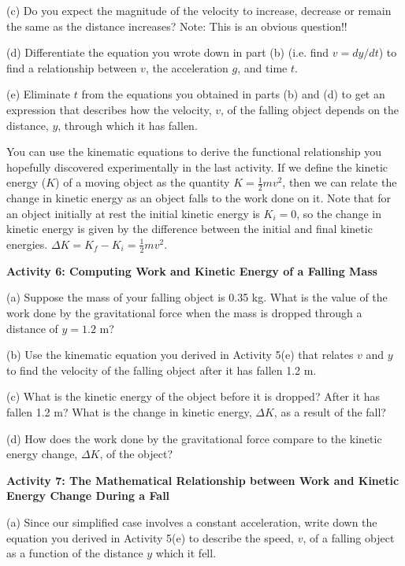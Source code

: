 \pagebreak[2]
(c) Do you expect the magnitude of the velocity to increase, decrease or remain
the same as the distance increases? Note: This is an obvious question!!
\answerspace{10mm}

(d) Differentiate the equation you wrote down in part (b) (i.e. find $v = dy/dt$) to find a relationship between $v$, the acceleration $g$, and time $t$.
\answerspace{20mm}

(e) Eliminate $t$ from the equations you obtained in parts (b) and (d) to get
an expression that describes how the velocity, $v$, 
of the falling object depends
on the distance, $y$, through which it has fallen. 
\answerspace{20mm}

You can use the kinematic equations to derive the functional relationship you
hopefully discovered experimentally in the last activity. If we define the kinetic
energy ($K$) of a moving object as the quantity $K = \frac{1}{2}mv^{2}$, then we
can relate the change in kinetic energy as an object falls to the work done
on it. Note that for an object initially at rest the initial kinetic energy
is \(K _{i}=0\), so the change in kinetic energy is given by the difference
between the initial and final kinetic energies. \( \Delta  K = K _{f}
- K_{i}  = \frac{1}{2}mv^{2} \).

\bigskip
\textbf{Activity 6: Computing Work and Kinetic Energy of a Falling Mass} 

(a) Suppose the mass of your falling object is 0.35 kg. What is the value of
the work done by the gravitational force when the mass is dropped through a
distance of $y = 1.2$ m? 
\answerspace{20mm}

(b) Use the kinematic equation you derived in Activity 5(e) that relates $v$ and
$y$ to find the velocity of the falling object after it has fallen 1.2 m.
\answerspace{20mm}

(c) What is the kinetic energy of the object before it is dropped? After it
has fallen 1.2 m? What is the change in kinetic energy, \( \Delta  K\), as
a result of the fall?
\answerspace{20mm}

(d) How does the work done by the gravitational force compare to the kinetic
energy change, \( \Delta  K\), of the object?
\answerspace{20mm}

\pagebreak[2]

\textbf{Activity 7: The Mathematical Relationship between Work and Kinetic Energy
Change During a Fall }

(a) Since our simplified case involves a constant acceleration, write down the
equation you derived in Activity 5(e) to describe the speed, $v$, of a falling
object as a function of the distance $y$ which it fell.
\vspace{10mm}

